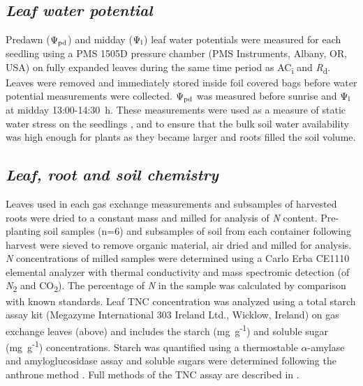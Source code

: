 \documentclass[a4paper]{article}\usepackage[]{graphicx}\usepackage[]{color}
\begin{document}
\subsection*{\textit{Leaf water potential}}
Predawn ($\Psi\textsubscript{pd}$) and midday ($\Psi\textsubscript{l}$) leaf water potentials were measured for each seedling using a PMS 1505D pressure chamber (PMS Instruments, Albany, OR, USA) on fully expanded leaves during the same time period as AC\textsubscript{i} and \textit{R}\textsubscript{d}. Leaves were removed and immediately stored inside foil covered bags before water potential measurements were collected. $\Psi\textsubscript{pd}$ was measured before sunrise and $\Psi\textsubscript{l}$ at midday 13:00-14:30~h. These measurements were used as a measure of static water stress on the seedlings \citep{sellin1999does}, and to ensure that the bulk soil water availability was high enough for plants as they became larger and roots filled the soil volume. 

\subsection*{\textit{Leaf, root and soil chemistry}}
Leaves used in each gas exchange measurements and subsamples of harvested roots were dried to a constant mass and milled for analysis of \textit{N} content. Pre-planting soil samples (n=6) and subsamples of soil from each container following harvest were sieved to remove organic material, air dried and milled for analysis. \textit{N} concentrations of milled samples were determined using a Carlo Erba CE1110 elemental analyzer with thermal conductivity and mass spectromic detection (of \textit{N}\textsubscript{2} and CO\textsubscript{2}).  The percentage of \textit{N} in the sample was calculated by comparison with known standards. Leaf TNC concentration was analyzed using a total starch assay kit (Megazyme International 303 Ireland Ltd., Wicklow, Ireland) on gas exchange leaves (above) and includes the starch (mg~g\textsuperscript{-1}) and soluble sugar (mg~g\textsuperscript{-1}) concentrations. Starch was quantified using a thermostable $\alpha$-amylase and amyloglucosidase assay \citep{McCleary_starch} and soluble sugars were determined following the anthrone method \citep{ebell1969variation}. Full methods of the TNC assay are described in \citep{mitchell2013drought}.
\end{document}
